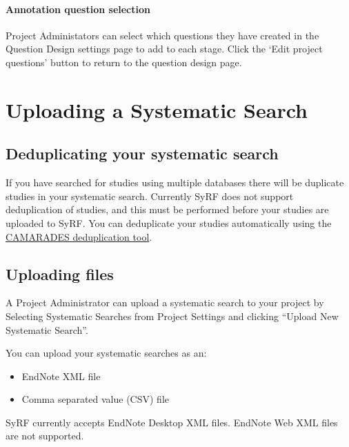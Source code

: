 \documentclass[
]{book}
\providecommand{\tightlist}{%
  \setlength{\itemsep}{0pt}\setlength{\parskip}{0pt}}
\begin{document}
\hypertarget{annotation-question-selection}{%
\subsubsection{Annotation question selection}\label{annotation-question-selection}}

Project Administators can select which questions they have created in the Question Design settings page to add to each stage. Click the `Edit project questions' button to return to the question design page.

\hypertarget{systematicSearch}{%
\chapter{Uploading a Systematic Search}\label{systematicSearch}}

\hypertarget{deduplicating-your-systematic-search}{%
\section{Deduplicating your systematic search}\label{deduplicating-your-systematic-search}}

If you have searched for studies using multiple databases there will be duplicate studies in your systematic search. Currently SyRF does not support deduplication of studies, and this must be performed before your studies are uploaded to SyRF. You can deduplicate your studies automatically using the \href{https://camarades.shinyapps.io/RDedup/}{CAMARADES deduplication tool}.

\hypertarget{uploading-files}{%
\section{Uploading files}\label{uploading-files}}

A Project Administrator can upload a systematic search to your project by Selecting Systematic Searches from Project Settings and clicking ``Upload New Systematic Search''.

You can upload your systematic searches as an:

\begin{itemize}
\tightlist
\item
  EndNote XML file
\item
  Comma separated value (CSV) file
\end{itemize}

SyRF currently accepts EndNote Desktop XML files. EndNote Web XML files are not supported.
\end{document}
